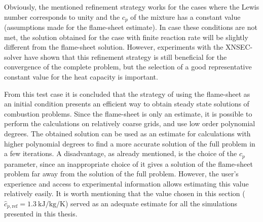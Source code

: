 



Obviously, the mentioned refinement strategy works for the cases where the Lewis number corresponds to unity and the $c_p$ of the mixture has a constant value (assumptions made for the flame-sheet estimate). In case these conditions are not met, the solution obtained for the case with finite reaction rate will be slightly different from the flame-sheet solution. However, experiments with the XNSEC-solver have shown that this refinement strategy is still beneficial for the convergence of the complete problem, but the selection of a good representative constant value for the heat capacity is important. 

 
 From this test case it is concluded that the strategy of using the flame-sheet as an initial condition presents an efficient way to obtain steady state solutions of combustion problems. Since the flame-sheet is only an estimate, it is possible to perform the calculations on relatively coarse grids, and use low order polynomial degrees. The obtained solution can be used as an estimate for calculations with higher polynomial degrees to find a more accurate solution of the full problem in a few iterations. A disadvantage, as already mentioned, is the choice of the $c_p$ parameter, since an inappropriate choice of it gives a solution of the flame-sheet problem far away from the solution of the full problem. However, the user's experience and access to experimental information allows estimating this value relatively easily. It is worth mentioning that the value chosen in this section ($\hat{c}_{p,\text{ref}}= \SI{1.3}{\kilo \joule \per \kilo \gram \per \kelvin}$)  served as an adequate estimate for all the simulations presented in this thesis.  
 